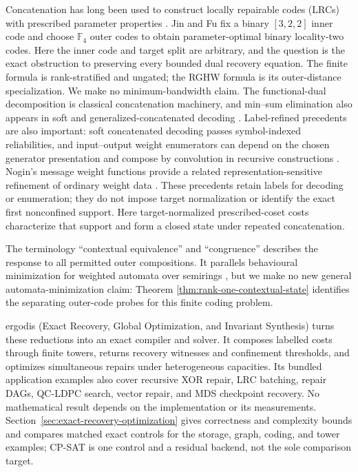 \documentclass[11pt]{article}
\theoremstyle{definition}
\newcommand{\F}{\mathbb F}
\begin{document}
Concatenation has long been used to construct locally repairable codes (LRCs)
with prescribed parameter properties \cite{LiuEtAl2022,JinFu2026}.  Jin and Fu
fix a binary $[3,2,2]$
inner code and choose $\F_4$ outer codes to obtain parameter-optimal binary
locality-two codes.  Here the inner code and target split are arbitrary, and the
question is the exact obstruction to preserving every bounded dual recovery
equation.  The finite formula is rank-stratified and ungated; the RGHW formula
is its outer-distance specialization.  We make no minimum-bandwidth claim.
The functional-dual decomposition is classical concatenation machinery, and
min--sum elimination also appears in soft and generalized-concatenated decoding
\cite{Forney1966,ChenLingXing2005,AjiMcEliece2000,GuruswamiSudan2002,
BlomqvistEtAl2020}.  Label-refined precedents are also important: soft
concatenated decoding passes symbol-indexed reliabilities, and input--output
weight enumerators can depend on the chosen generator presentation and compose
by convolution in recursive constructions
\cite{GuruswamiSudan2002,LoskotBeaulieu2006}.  Nogin's message
weight functions provide a related representation-sensitive refinement of
ordinary weight data \cite{Nogin2005}.  These precedents retain labels for
decoding or enumeration; they do not impose target normalization or identify
the exact first nonconfined support.  Here target-normalized prescribed-coset
costs characterize that support and form a closed state under repeated
concatenation.

The terminology ``contextual equivalence'' and ``congruence'' describes the
response to all permitted outer compositions.  It parallels behavioural
minimization for weighted automata over semirings \cite{Mohri2009}, but we make
no new general automata-minimization claim: Theorem
\ref{thm:rank-one-contextual-state} identifies the separating outer-code probes
for this finite coding problem.

ergodis (Exact Recovery, Global Optimization, and Invariant Synthesis) turns
these reductions into an exact compiler and solver.  It composes labelled
costs through finite towers, returns recovery witnesses and confinement
thresholds, and optimizes simultaneous repairs under heterogeneous capacities.
Its bundled application examples also cover recursive XOR repair, LRC
batching, repair DAGs, QC-LDPC search, vector repair, and MDS checkpoint
recovery.  No mathematical result depends on the implementation or its
measurements.
Section~\ref{sec:exact-recovery-optimization} gives correctness and complexity
bounds and compares matched exact controls for the storage, graph, coding, and
tower examples; CP-SAT is one control and a residual backend, not the sole
comparison target.
\end{document}
